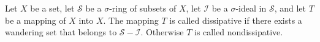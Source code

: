 Let $X$ be a set, let $\mathcal{S}$ be a $\sigma$-ring of subsets of $X$, let $\mathcal{I}$ be a $\sigma$-ideal in $\mathcal{S}$, and let $T$ be a mapping of $X$ into $X$. The mapping $T$ is called dissipative if there exists a wandering set that belongs to $\mathcal{S} - \mathcal{I}$. Otherwise $T$ is called nondissipative.